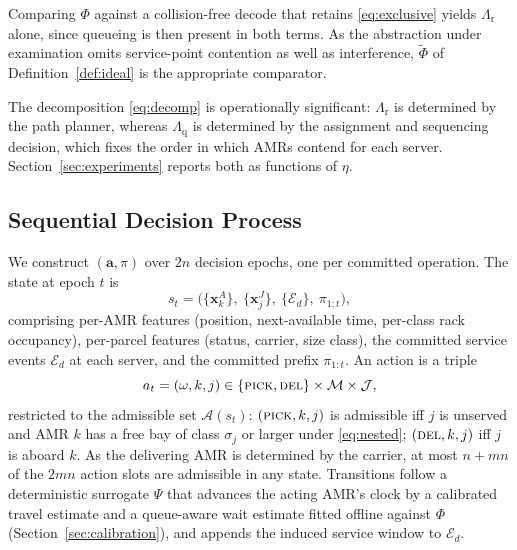\begin{remark}
\label{rem:comparator}
Comparing $\Phi$ against a collision-free decode that retains
\eqref{eq:exclusive} yields $\Lambda_{\mathrm{r}}$ alone, since queueing is
then present in both terms. As the abstraction under examination omits
service-point contention as well as interference, $\tilde{\Phi}$ of
Definition~\ref{def:ideal} is the appropriate comparator.
\end{remark}

The decomposition \eqref{eq:decomp} is operationally significant:
$\Lambda_{\mathrm{r}}$ is determined by the path planner, whereas
$\Lambda_{\mathrm{q}}$ is determined by the assignment and sequencing
decision, which fixes the order in which AMRs contend for each server.
Section~\ref{sec:experiments} reports both as functions of $\eta$.

\subsection{Sequential Decision Process}
\label{sec:mdp}

We construct $(\bm{a},\pi)$ over $2n$ decision epochs, one per committed
operation. The state at epoch $t$ is
\begin{equation}
s_t=\big(\{\bm{x}^{A}_{k}\},\ \{\bm{x}^{J}_{j}\},\ \{\mathcal{E}_d\},\ \pi_{1:t}\big),
\label{eq:state}
\end{equation}
comprising per-AMR features (position, next-available time, per-class rack
occupancy), per-parcel features (status, carrier, size class), the committed
service events $\mathcal{E}_d$ at each server, and the committed prefix
$\pi_{1:t}$. An action is a triple
\begin{equation}
a_t=(\omega,k,j)\in\{\textsc{pick},\textsc{del}\}\times\mathcal{M}\times\mathcal{J},
\label{eq:action}
\end{equation}
restricted to the admissible set $\mathcal{A}(s_t)$: $(\textsc{pick},k,j)$
is admissible iff $j$ is unserved and AMR $k$ has a free bay of class
$\sigma_j$ or larger under \eqref{eq:nested}; $(\textsc{del},k,j)$ iff $j$ is
aboard $k$. As the delivering AMR is determined by the carrier, at most
$n+mn$ of the $2mn$ action slots are admissible in any state. Transitions
follow a deterministic surrogate $\hat{\Psi}$ that advances the acting AMR's
clock by a calibrated travel estimate and a queue-aware wait estimate fitted
offline against $\Phi$ (Section~\ref{sec:calibration}), and appends the
induced service window to $\mathcal{E}_d$.

